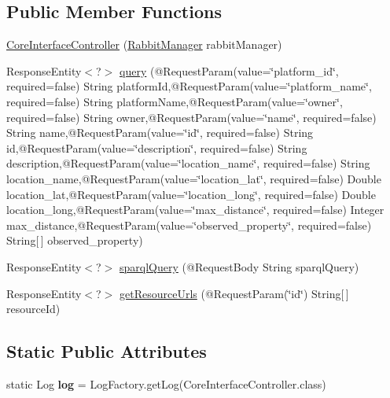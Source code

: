\subsection*{Public Member Functions}
\begin{DoxyCompactItemize}
\item 
\hyperlink{classeu_1_1h2020_1_1symbiote_1_1controllers_1_1CoreInterfaceController_a58b26a72b6964d21f04c7f680640dcce}{Core\+Interface\+Controller} (\hyperlink{classeu_1_1h2020_1_1symbiote_1_1communication_1_1RabbitManager}{Rabbit\+Manager} rabbit\+Manager)
\item 
Response\+Entity$<$?$>$ \hyperlink{classeu_1_1h2020_1_1symbiote_1_1controllers_1_1CoreInterfaceController_a77e06f47bb9cea92496704aae1b88b86}{query} (@Request\+Param(value=\char`\"{}platform\+\_\+id\char`\"{}, required=false) String platform\+Id,@Request\+Param(value=\char`\"{}platform\+\_\+name\char`\"{}, required=false) String platform\+Name,@Request\+Param(value=\char`\"{}owner\char`\"{}, required=false) String owner,@Request\+Param(value=\char`\"{}name\char`\"{}, required=false) String name,@Request\+Param(value=\char`\"{}id\char`\"{}, required=false) String id,@Request\+Param(value=\char`\"{}description\char`\"{}, required=false) String description,@Request\+Param(value=\char`\"{}location\+\_\+name\char`\"{}, required=false) String location\+\_\+name,@Request\+Param(value=\char`\"{}location\+\_\+lat\char`\"{}, required=false) Double location\+\_\+lat,@Request\+Param(value=\char`\"{}location\+\_\+long\char`\"{}, required=false) Double location\+\_\+long,@Request\+Param(value=\char`\"{}max\+\_\+distance\char`\"{}, required=false) Integer max\+\_\+distance,@Request\+Param(value=\char`\"{}observed\+\_\+property\char`\"{}, required=false) String\mbox{[}$\,$\mbox{]} observed\+\_\+property)
\item 
Response\+Entity$<$?$>$ \hyperlink{classeu_1_1h2020_1_1symbiote_1_1controllers_1_1CoreInterfaceController_adfa6e88c052cd6e8978294588fe116d5}{sparql\+Query} (@Request\+Body String sparql\+Query)
\item 
Response\+Entity$<$?$>$ \hyperlink{classeu_1_1h2020_1_1symbiote_1_1controllers_1_1CoreInterfaceController_a11f9875a81bc3f2a8150b1fb12285ce4}{get\+Resource\+Urls} (@Request\+Param(\char`\"{}id\char`\"{}) String\mbox{[}$\,$\mbox{]} resource\+Id)
\end{DoxyCompactItemize}
\subsection*{Static Public Attributes}
\begin{DoxyCompactItemize}
\item 
static Log {\bfseries log} = Log\+Factory.\+get\+Log(Core\+Interface\+Controller.\+class)\hypertarget{classeu_1_1h2020_1_1symbiote_1_1controllers_1_1CoreInterfaceController_a0890e1d907ac6cfdd976c53c5cdb5743}{}\label{classeu_1_1h2020_1_1symbiote_1_1controllers_1_1CoreInterfaceController_a0890e1d907ac6cfdd976c53c5cdb5743}

\end{DoxyCompactItemize}


